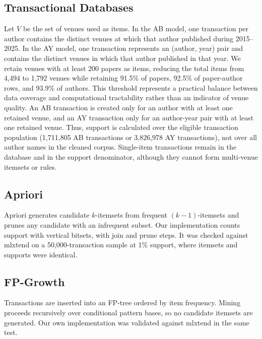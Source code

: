 ﻿\documentclass[conference]{IEEEtran}
\begin{document}
\subsection{Transactional Databases}
Let $V$ be the set of venues used as items. In the AB model, one transaction per author contains the distinct venues at which that author published during 2015--2025. In the AY model, one transaction represents an (author, year) pair and contains the distinct venues in which that author published in that year. We retain venues with at least 200 papers as items, reducing the total items from 4,494 to 1,792 venues while retaining 91.5\% of papers, 92.5\% of paper-author rows, and 93.9\% of authors. This threshold represents a practical balance between data coverage and computational tractability rather than an indicator of venue quality. An AB transaction is created only for an author with at least one retained venue, and an AY transaction only for an author-year pair with at least one retained venue. Thus, support is calculated over the eligible transaction population (1,711,805 AB transactions or 3,826,978 AY transactions), not over all author names in the cleaned corpus. Single-item transactions remain in the database and in the support denominator, although they cannot form multi-venue itemsets or rules.

\subsection{Apriori}
Apriori generates candidate $k$-itemsets from frequent $(k-1)$-itemsets and prunes any candidate with an infrequent subset. Our implementation counts support with vertical bitsets, with join and prune steps. It was checked against mlxtend on a 50,000-transaction sample at 1\% support, where itemsets and supports were identical.

\subsection{FP-Growth}
Transactions are inserted into an FP-tree ordered by item frequency. Mining proceeds recursively over conditional pattern bases, so no candidate itemsets are generated. Our own implementation was validated against mlxtend in the same test.
\end{document}
